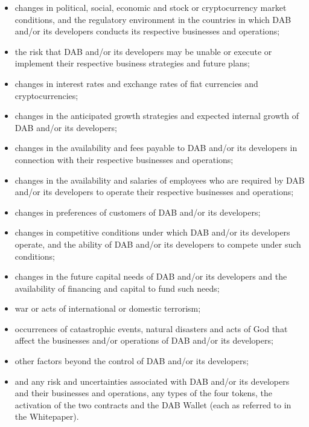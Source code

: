 \documentclass[review]{elsarticle}
\begin{document}
\begin{itemize}
   \item changes in political, social, economic and stock or cryptocurrency market conditions, and the regulatory environment in the countries in which DAB and/or its developers conducts its respective businesses and operations;
   \item the risk that DAB and/or its developers may be unable or execute or implement their respective business strategies and future plans;
   \item changes in interest rates and exchange rates of fiat currencies and cryptocurrencies;
   \item changes in the anticipated growth strategies and expected internal growth of DAB and/or its developers;
   \item changes in the availability and fees payable to DAB and/or its developers in connection with their respective businesses and operations;
   \item changes in the availability and salaries of employees who are required by DAB and/or its developers to operate their respective businesses and operations;
   \item changes in preferences of customers of DAB and/or its developers;
	\item changes in competitive conditions under which DAB and/or its developers operate, and the ability of DAB and/or its developers to compete under such conditions;
   \item changes in the future capital needs of DAB and/or its developers and the availability of financing and capital to fund such needs;
   \item war or acts of international or domestic terrorism;
   \item occurrences of catastrophic events, natural disasters and acts of God that affect the businesses and/or operations of DAB and/or its developers;
   \item other factors beyond the control of DAB and/or its developers;
   \item and any risk and uncertainties associated with DAB and/or its developers and their businesses and operations, any types of the four tokens, the activation of the two contracts and the DAB Wallet (each as referred to in the Whitepaper).
\end{itemize}
\end{document}
